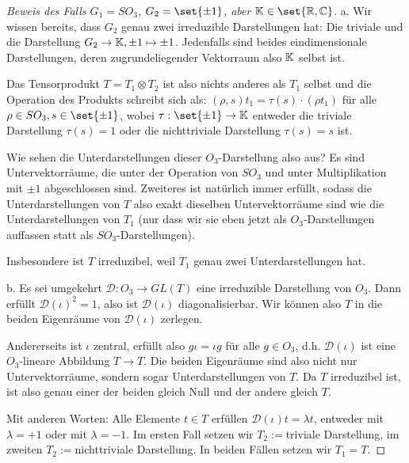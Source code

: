 \begin{proof}[Beweis des Falls $G_1=SO_3$, $G_2=\set{\pm 1}$, aber $\IK\in\set{\IR,\IC}$]
a. Wir wissen bereits, dass $G_2$ genau zwei irreduzible Darstellungen hat: Die triviale und die Darstellung $G_2\to\mathbb{K}, \pm 1 \mapsto \pm 1$. Jedenfalls sind beides eindimensionale Darstellungen, deren zugrundeliegender Vektorraum also $\mathbb{K}$ selbst ist.

Das Tensorprodukt $T=T_1\otimes T_2$ ist also nichts anderes als $T_1$ selbst und die Operation des Produkts schreibt sich als: $(\rho,s)t_1 = \tau(s)\cdot (\rho t_1)$ für alle $\rho\in SO_3, s\in\set{\pm 1}$, wobei $\tau: \set{\pm 1} \to \IK$ entweder die triviale Darstellung $\tau(s)=1$ oder die nichttriviale Darstellung $\tau(s)=s$ ist.

Wie sehen die Unterdarstellungen dieser $O_3$-Darstellung also aus? Es sind Untervektorräume, die unter der Operation von $SO_3$ und unter Multiplikation mit $\pm 1$ abgeschlossen sind. Zweiteres ist natürlich immer erfüllt, sodass die Unterdarstellungen von $T$ also exakt dieselben Untervektorräume sind wie die Unterdarstellungen von $T_1$ (nur dass wir sie eben jetzt als $O_3$-Darstellungen auffassen statt als $SO_3$-Darstellungen).

Insbesondere ist $T$ irreduzibel, weil $T_1$ genau zwei Unterdarstellungen hat.

\medbreak
b. Es sei umgekehrt $\mathcal{D}: O_3\to GL(T)$ eine irreduzible Darstellung von $O_3$. Dann erfüllt $\mathcal{D}(\iota)^2=1$, also ist $\mathcal{D}(\iota)$ diagonalisierbar. Wir können also $T$ in die beiden Eigenräume von $\mathcal{D}(\iota)$ zerlegen.

Andererseits ist $\iota$ zentral, erfüllt also $g\iota=\iota g$ für alle $g\in O_3$, d.h. $\mathcal{D}(\iota)$ ist eine $O_3$-lineare Abbildung $T\to T$. Die beiden Eigenräume sind also nicht nur Untervektorräume, sondern sogar Unterdarstellungen von $T$. Da $T$ irreduzibel ist, ist also genau einer der beiden gleich Null und der andere gleich $T$.

Mit anderen Worten: Alle Elemente $t\in T$ erfüllen $\mathcal{D}(\iota)t=\lambda t$, entweder mit $\lambda=+1$ oder mit $\lambda=-1$. Im ersten Fall setzen wir $T_2:=$triviale Darstellung, im zweiten $T_2:=$nichttriviale Darstellung. In beiden Fällen setzen wir $T_1=T$.
\end{proof}

